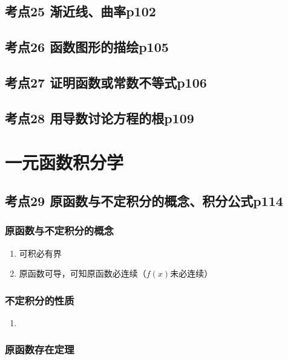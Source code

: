 \section{考点25 渐近线、曲率p102}

\section{考点26 函数图形的描绘p105}

\section{考点27 证明函数或常数不等式p106}

\section{考点28 用导数讨论方程的根p109}

\chapter{一元函数积分学}

\section{考点29 原函数与不定积分的概念、积分公式p114}

\subsection{原函数与不定积分的概念}

\begin{enumerate}
    \item 可积必有界
    \item 原函数可导，可知原函数必连续（$f(x)$未必连续）
\end{enumerate}

\subsection{不定积分的性质}

\begin{enumerate}
    \item 
\end{enumerate}

\subsection{原函数存在定理}

